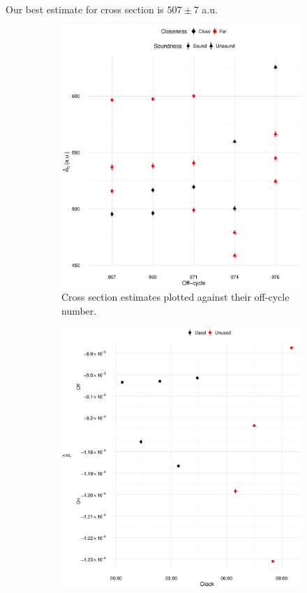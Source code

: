 \documentclass[reprint]{revtex4-1}
\newcommand{\scl}{.4}
\begin{document}
Our best estimate for cross section is $507 \pm 7$ a.u. 

\begin{figure}
\begin{subfigure}{.5\textwidth}
\includegraphics[scale=\scl]{img/Cross-Section2012_all.eps}
\caption{Cross section estimates plotted against their off-cycle number.\label{fig:CS-all}}
\end{subfigure}
\begin{subfigure}{.5\textwidth}
\includegraphics[scale=\scl]{img/Slopes-2012_big.eps}

\end{subfigure}
\end{figure}
\end{document}
